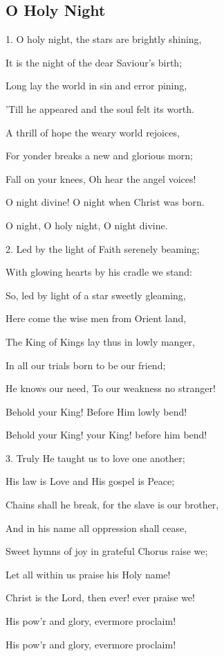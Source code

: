 \subsection{O Holy Night}\label{o_holy_night}
\begin{description}[nosep,leftmargin=\parindent,labelsep=0pt]
\item 1. O holy night, the stars are brightly shining, 
\item It is the night of the dear Saviour’s birth; 
\item Long lay the world in sin and error pining, 
\item 'Till he appeared and the soul felt its worth. 
\item A thrill of hope the weary world rejoices, 
\item For yonder breaks a new and glorious morn; 
\vspace{1.5ex}
\item Fall on your knees, Oh hear the angel voices! 
\item O night divine! O night when Christ was born. 
\item O night, O holy night, O night divine. 
\vspace{1.5ex}
\item 2. Led by the light of Faith serenely beaming; 
\item With glowing hearts by his cradle we stand: 
\item So, led by light of a star sweetly gleaming, 
\item Here come the wise men from Orient land, 
\item The King of Kings lay thus in lowly manger, 
\item In all our trials born to be our friend; 
\vspace{1.5ex}
\item He knows our need, To our weakness no stranger! 
\item Behold your King! Before Him lowly bend! 
\item Behold your King! your King! before him bend! 
\vspace{1.5ex}
\item 3. Truly He taught us to love one another; 
\item His law is Love and His gospel is Peace; 
\item Chains shall he break, for the slave is our brother, 
\item And in his name all oppression shall cease, 
\item Sweet hymns of joy in grateful Chorus raise we; 
\item Let all within us praise his Holy name! 
\vspace{1.5ex}
\item Christ is the Lord, then ever! ever praise we! 
\item His pow'r and glory, evermore proclaim! 
\item His pow'r and glory, evermore proclaim! 
\end{description}

